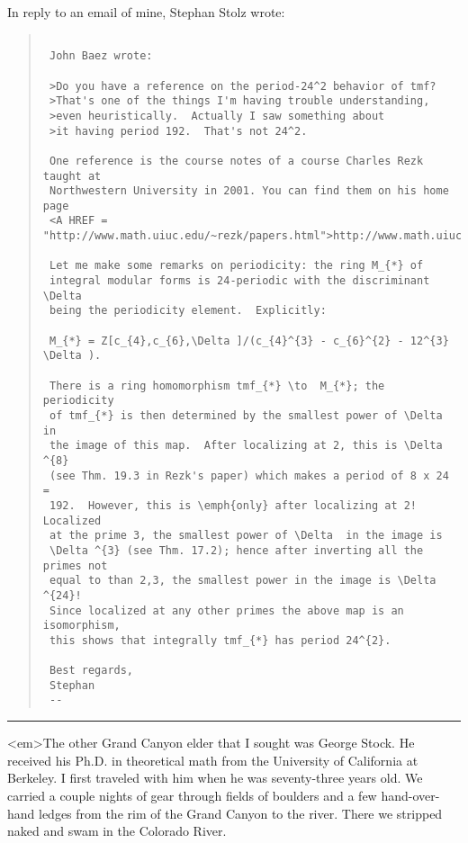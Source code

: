 In reply to an email of mine, Stephan Stolz wrote:

\begin{quote}

\begin{verbatim}

 John Baez wrote:

 >Do you have a reference on the period-24^2 behavior of tmf?
 >That's one of the things I'm having trouble understanding,
 >even heuristically.  Actually I saw something about
 >it having period 192.  That's not 24^2.

 One reference is the course notes of a course Charles Rezk taught at 
 Northwestern University in 2001. You can find them on his home page
 <A HREF = "http://www.math.uiuc.edu/~rezk/papers.html">http://www.math.uiuc.edu/~rezk/papers.html</A>

 Let me make some remarks on periodicity: the ring M_{*} of 
 integral modular forms is 24-periodic with the discriminant \Delta 
 being the periodicity element.  Explicitly:

 M_{*} = Z[c_{4},c_{6},\Delta ]/(c_{4}^{3} - c_{6}^{2} - 12^{3} \Delta ).

 There is a ring homomorphism tmf_{*} \to  M_{*}; the periodicity 
 of tmf_{*} is then determined by the smallest power of \Delta  in 
 the image of this map.  After localizing at 2, this is \Delta ^{8} 
 (see Thm. 19.3 in Rezk's paper) which makes a period of 8 x 24 = 
 192.  However, this is \emph{only} after localizing at 2!  Localized 
 at the prime 3, the smallest power of \Delta  in the image is 
 \Delta ^{3} (see Thm. 17.2); hence after inverting all the primes not
 equal to than 2,3, the smallest power in the image is \Delta ^{24}! 
 Since localized at any other primes the above map is an isomorphism, 
 this shows that integrally tmf_{*} has period 24^{2}.

 Best regards,
 Stephan
 -- 
\end{verbatim}
    
\end{quote}

\par\noindent\rule{\textwidth}{0.4pt}
<em>The other Grand Canyon elder that I sought was George Stock.
He received his Ph.D. in theoretical math from the University of California
at Berkeley.  I first traveled with him when he was seventy-three years
old.  We carried a couple nights of gear through fields of boulders and
a few hand-over-hand ledges from the rim of the Grand Canyon to the river.
There we stripped naked and swam in the Colorado River.

